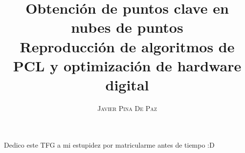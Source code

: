 \documentclass[a4paper,11pt]{book}
\title{\Huge \textbf{Obtención de puntos clave en nubes de puntos }   \\ \huge Reproducción de algoritmos de PCL y optimización de hardware digital}
\author{\textsc{Javier Pina De Paz}} %
\begin{document}
\frontmatter
\maketitle

\begin{dedication}
Dedico este TFG a mi estupidez por matricularme antes de tiempo :D
\end{dedication}

\tableofcontents

\mainmatter  %












\end{document}
